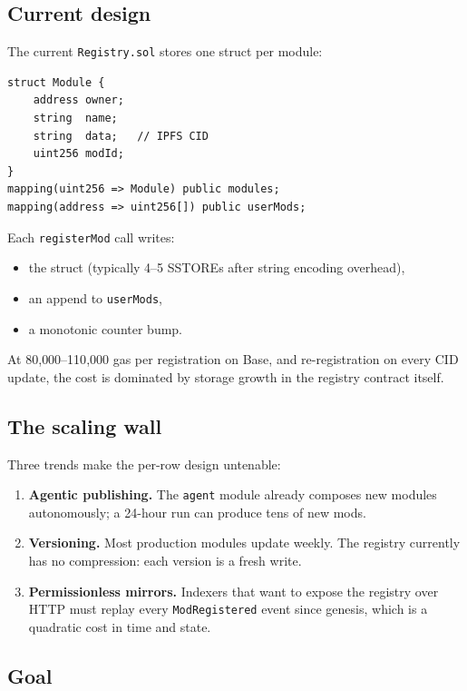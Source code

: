 \documentclass[11pt,a4paper]{article}
\begin{document}
\subsection{Current design}

The current \texttt{Registry.sol} stores one struct per module:

\begin{lstlisting}[style=solidity]
struct Module {
    address owner;
    string  name;
    string  data;   // IPFS CID
    uint256 modId;
}
mapping(uint256 => Module) public modules;
mapping(address => uint256[]) public userMods;
\end{lstlisting}

Each \texttt{registerMod} call writes:
\begin{itemize}
    \item the struct (typically 4--5 SSTOREs after string encoding overhead),
    \item an append to \texttt{userMods},
    \item a monotonic counter bump.
\end{itemize}

At 80{,}000--110{,}000 gas per registration on Base, and re-registration on every CID update, the cost is dominated by storage growth in the registry contract itself.

\subsection{The scaling wall}

Three trends make the per-row design untenable:

\begin{enumerate}
    \item \textbf{Agentic publishing.} The \texttt{agent} module already composes new modules autonomously; a 24-hour run can produce tens of new mods.
    \item \textbf{Versioning.} Most production modules update weekly. The registry currently has no compression: each version is a fresh write.
    \item \textbf{Permissionless mirrors.} Indexers that want to expose the registry over HTTP must replay every \texttt{ModRegistered} event since genesis, which is a quadratic cost in time and state.
\end{enumerate}

\subsection{Goal}
\end{document}
